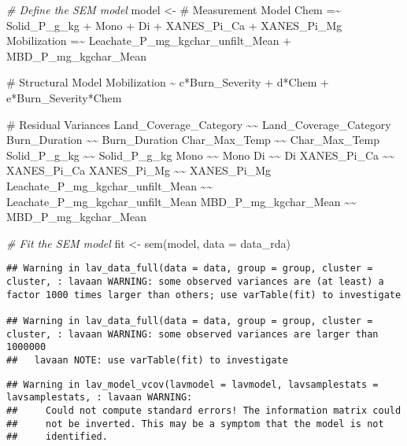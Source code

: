 \documentclass[
]{article}
\newenvironment{Shaded}{\begin{snugshade}}{\end{snugshade}}
\newcommand{\AttributeTok}[1]{\textcolor[rgb]{0.77,0.63,0.00}{#1}}
\newcommand{\CommentTok}[1]{\textcolor[rgb]{0.56,0.35,0.01}{\textit{#1}}}
\newcommand{\FunctionTok}[1]{\textcolor[rgb]{0.00,0.00,0.00}{#1}}
\newcommand{\NormalTok}[1]{#1}
\newcommand{\OtherTok}[1]{\textcolor[rgb]{0.56,0.35,0.01}{#1}}
\newcommand{\StringTok}[1]{\textcolor[rgb]{0.31,0.60,0.02}{#1}}
\begin{document}
\begin{Shaded}
\begin{Highlighting}[]
\CommentTok{\# Define the SEM model}
\NormalTok{model }\OtherTok{\textless{}{-}} \StringTok{\textquotesingle{}}
\StringTok{  \# Measurement Model}
\StringTok{    Chem =\textasciitilde{} Solid\_P\_g\_kg + Mono + Di + XANES\_Pi\_Ca + XANES\_Pi\_Mg}
\StringTok{    Mobilization =\textasciitilde{} Leachate\_P\_mg\_kgchar\_unfilt\_Mean + MBD\_P\_mg\_kgchar\_Mean}

\StringTok{  \# Structural Model}
\StringTok{    Mobilization \textasciitilde{} c*Burn\_Severity + d*Chem + e*Burn\_Severity*Chem}

\StringTok{  \# Residual Variances}
\StringTok{    Land\_Coverage\_Category \textasciitilde{}\textasciitilde{} Land\_Coverage\_Category}
\StringTok{    Burn\_Duration \textasciitilde{}\textasciitilde{} Burn\_Duration}
\StringTok{    Char\_Max\_Temp \textasciitilde{}\textasciitilde{} Char\_Max\_Temp}
\StringTok{    Solid\_P\_g\_kg \textasciitilde{}\textasciitilde{} Solid\_P\_g\_kg}
\StringTok{    Mono \textasciitilde{}\textasciitilde{} Mono}
\StringTok{    Di \textasciitilde{}\textasciitilde{} Di}
\StringTok{    XANES\_Pi\_Ca \textasciitilde{}\textasciitilde{} XANES\_Pi\_Ca}
\StringTok{    XANES\_Pi\_Mg \textasciitilde{}\textasciitilde{} XANES\_Pi\_Mg}
\StringTok{    Leachate\_P\_mg\_kgchar\_unfilt\_Mean \textasciitilde{}\textasciitilde{} Leachate\_P\_mg\_kgchar\_unfilt\_Mean}
\StringTok{    MBD\_P\_mg\_kgchar\_Mean \textasciitilde{}\textasciitilde{} MBD\_P\_mg\_kgchar\_Mean}
\StringTok{\textquotesingle{}}

\CommentTok{\# Fit the SEM model}
\NormalTok{fit }\OtherTok{\textless{}{-}} \FunctionTok{sem}\NormalTok{(model, }\AttributeTok{data =}\NormalTok{ data\_rda)}
\end{Highlighting}
\end{Shaded}

\begin{verbatim}
## Warning in lav_data_full(data = data, group = group, cluster = cluster, : lavaan WARNING: some observed variances are (at least) a factor 1000 times larger than others; use varTable(fit) to investigate

## Warning in lav_data_full(data = data, group = group, cluster = cluster, : lavaan WARNING: some observed variances are larger than 1000000
##   lavaan NOTE: use varTable(fit) to investigate
\end{verbatim}

\begin{verbatim}
## Warning in lav_model_vcov(lavmodel = lavmodel, lavsamplestats = lavsamplestats, : lavaan WARNING:
##     Could not compute standard errors! The information matrix could
##     not be inverted. This may be a symptom that the model is not
##     identified.
\end{verbatim}
\end{document}
